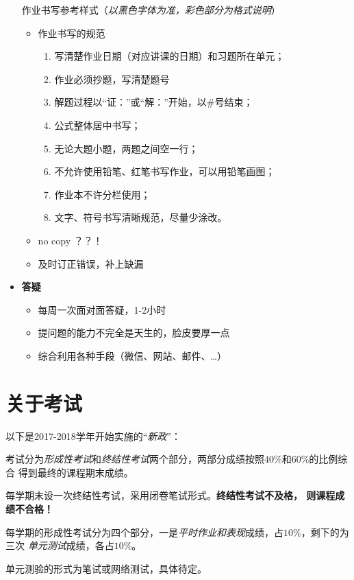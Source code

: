 \begin{itemize}
\begin{center}
  	作业书写参考样式（{\it 以黑色字体为准，彩色部分为格式说明}）
  \end{center}
  \begin{itemize}
    \item 作业书写的规范
    \begin{enumerate}
      \item 写清楚作业日期（对应讲课的日期）和习题所在单元；
      \item 作业必须抄题，写清楚题号
	  \item 解题过程以“证：”或“解：”开始，以$\#$号结束；
	  \item 公式整体居中书写；
	  \item 无论大题小题，两题之间空一行；
	  \item 不允许使用铅笔、红笔书写作业，可以用铅笔画图；
	  \item 作业本不许分栏使用；
	  \item 文字、符号书写清晰规范，尽量少涂改。
    \end{enumerate}    
    \item no copy ？？！
    \item 及时订正错误，补上缺漏
  \end{itemize}
	\item {\bf 答疑}
	  \begin{itemize}
	    \item 每周一次面对面答疑，1-2小时
	    \item 提问题的能力不完全是天生的，脸皮要厚一点
	    \item 综合利用各种手段（微信、网站、邮件、\ldots）
	  \end{itemize}
\end{itemize}

\section{关于考试}

以下是2017-2018学年开始实施的“{\it 新政}”：

考试分为{\it 形成性考试}和{\it 终结性考试}两个部分，两部分成绩按照$40\%$和$60\%$的比例综合
得到最终的课程期末成绩。

每学期末设一次终结性考试，采用闭卷笔试形式。{\color{red}\bf 终结性考试不及格，
则课程成绩不合格！}

每学期的形成性考试分为四个部分，一是{\it 平时作业和表现}成绩，占$10\%$，剩下的为三次
{\it 单元测试}成绩，各占$10\%$。

单元测验的形式为笔试或网络测试，具体待定。

